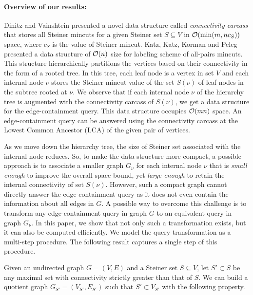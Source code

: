 \paragraph{Overview of our results:} Dinitz and Vainshtein \cite{DBLP:journals/siamcomp/DinitzV00}
presented a novel data structure called {\em connectivity carcass} that stores all Steiner mincuts for a given Steiner set $S\subseteq V$ in ${\cal O}(\min(m,nc_S))$ space, where $c_S$ is the value of Steiner mincut. %
Katz, Katz, Korman and Peleg \cite{DBLP:journals/siamcomp/KatzKKP04} presented a data structure of ${\cal O}(n)$ size for labeling scheme of all-pairs mincuts. This structure hierarchically partitions the vertices based on their connectivity in the form of a rooted tree. In this tree, each leaf node is a vertex in set $V$ and each internal node $\nu$ stores the Steiner mincut value of the set $S(\nu)$ of leaf nodes in the subtree rooted at $\nu$. %
We observe that if each internal node $\nu$ of the hierarchy tree
is augmented with the connectivity carcass of $S(\nu)$, we get a data structure for the edge-containment query. This data structure occupies ${\cal O}(mn)$ space. An edge-containment query can be answered using the connectivity carcass at the Lowest Common Ancestor (LCA) of the given pair of vertices.

As we move down the hierarchy tree, the size of Steiner set associated with the internal node reduces. So, to make the data structure more compact, a possible approach is to associate a smaller graph $G_\nu$ for each internal node $\nu$ that is {\em small enough} to improve the overall space-bound, yet {\em large enough} to retain the internal connectivity of set $S(\nu)$. 
However, such a compact graph cannot directly answer the edge-containment query as it does not even contain the information about all edges in $G$. A possible way to overcome this challenge is to transform any edge-containment query in graph $G$ to an equivalent query in graph $G_{\nu}$. In this paper, we show that not only such a transformation exists, but it can also be computed efficiently. We model the query transformation as a multi-step procedure. The following result captures a single step of this procedure.

Given an undirected graph $G=(V,E)$ and a Steiner set $S\subseteq V$, let $S'\subset S$ be any maximal set with connectivity strictly greater than that of $S$. We can build a quotient graph $G_{S'}=(V_{S'},E_{S'})$ such that $S' \subset V_{S'}$ with the following property.

